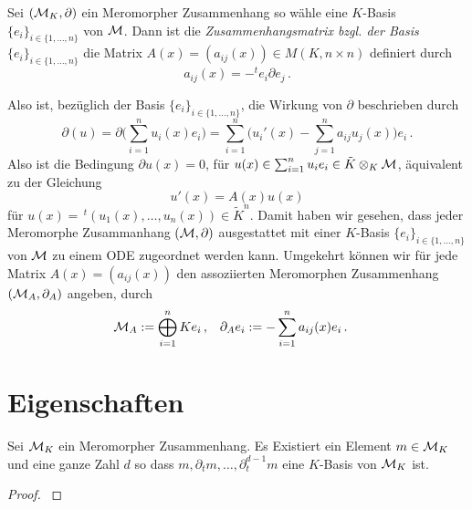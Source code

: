 \begin{defn}[Zusammenhangsmatrix] \cite[Seite 129]{hotta2007d}
Sei $(\mathcal{M}_K,\partial)$ ein Meromorpher Zusammenhang so wähle eine $K$-Basis
$\{e_i\}_{i\in\{1,\dots,n\}}$ von $\mathcal{M}$. Dann ist die
\emph{Zusammenhangsmatrix bzgl. der Basis $\{e_i\}_{i\in\{1,\dots,n\}}$} die
Matrix $A(x)=(a_{ij}(x))\in M(K,n\times n)$ definiert durch 
\[ a_{ij}(x) = -^te_i \partial e_j \,. \]
\end{defn}

Also ist, bezüglich der Basis $\{e_i\}_{i\in\{1,\dots,n\}}$, die Wirkung von
$\partial$ beschrieben durch 
\[
\partial(u) = \partial \Big( \sum_{i=1}^nu_i(x)e_i \Big) 
=\sum_{i=1}^n \Big( u_i'(x)- \sum_{j=1}^na_{ij}u_j(x) \Big)e_i \,.
\]
Also ist die Bedingung $\partial u(x)=0$, für $u(x)\in \sum_{i=1}^n u_ie_i\in
\tilde K \otimes_K\mathcal{M}$, äquivalent zu der Gleichung
\begin{equation}
u'(x)=A(x)u(x)
\end{equation}
für $u(x)=\,^t(u_1(x),\dots,u_n(x))\in\tilde K^n$. Damit haben wir gesehen,
dass jeder Meromorphe Zusammanhang $(\mathcal{M},\partial)$ ausgestattet mit einer
$K$-Basis $\{e_i\}_{i\in\{1,\dots,n\}}$ von $\mathcal{M}$ zu einem ODE zugeordnet
werden kann. Umgekehrt können wir für jede Matrix $A(x)=(a_{ij}(x))$ den
assoziierten Meromorphen Zusammenhang $(\mathcal{M}_A,\partial_A)$ %
angeben, durch
\begin{align*}
\mathcal{M}_A & :=\bigoplus_{i=1}^n Ke_i \,, & \partial_A e_i &:=
-\sum_{i=1}^na_{ij}(x)e_i \,.
\end{align*}

\section{Eigenschaften}
\begin{comment}
\cite[4.2]{sabbah_cimpa90}
Let $\cM$ be a left $\cD$-module. First we consider it only as a
$\C\{x\}$-module and let $\cM[x^{-1}]$ be the localized module.
\end{comment}

\begin{lem}
\cite[Thm 4.3.3]{sabbah_cimpa90}
\cite[Satz 4.8]{ZulaBarbara}
Sei $\mathcal{M}_K$ ein Meromorpher Zusammenhang. Es Existiert ein Element
$m\in\mathcal{M}_K$ und eine ganze Zahl $d$ so dass
$m,\partial_tm,\dots,\partial_t^{d-1}m$ eine $K$-Basis von $\mathcal{M}_K$ ist.
\end{lem}
\begin{proof}
\cite[Satz 4.8]{ZulaBarbara}
\end{proof}

